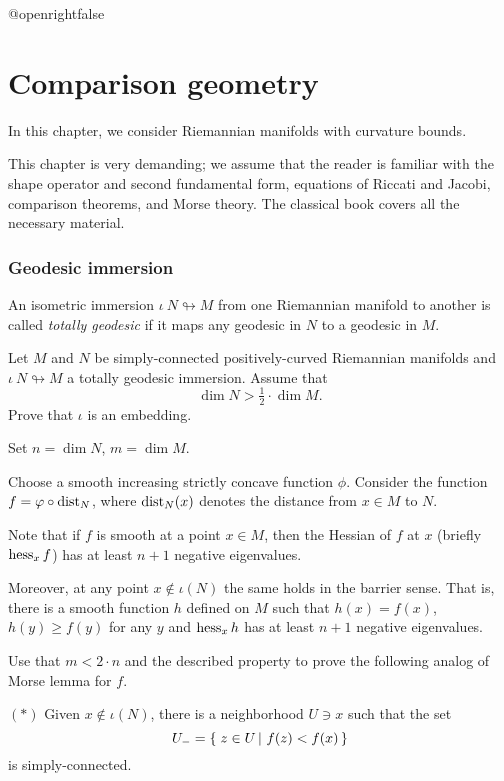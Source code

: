 \csname @openrightfalse\endcsname
\chapter{Comparison geometry}

In this chapter, we consider Riemannian manifolds with curvature bounds.

This chapter is very demanding;
we assume that the reader is familiar with   
the shape operator and second fundamental form, 
equations of Riccati and Jacobi,
comparison theorems,
and Morse theory.
The classical book \cite{cheeger-ebin} covers all the  necessary  material.

\subsection*{Geodesic immersion\hard}
\label{Geodesic immersion}

An isometric immersion $\iota\:N\looparrowright M$ from one Riemannian manifold to another is called \emph{totally geodesic} if it maps any geodesic in $N$ to a geodesic in $M$.

\begin{pr}
Let $M$ and $N$ be simply-connected positively-curved Riemannian manifolds and $\iota\:N\looparrowright M$ a totally geodesic immersion.
Assume that 
\[\dim N>\tfrac 12\cdot \dim M.\]
Prove that $\iota$ is an embedding.
\end{pr}

Set $n=\dim N$, $m=\dim M$.

Choose a smooth increasing strictly concave function $\phi$.
Consider the function $f=\varphi\circ\operatorname{\rm dist}\nolimits_N$,
where $\operatorname{\rm dist}\nolimits_N(x)$ denotes the distance from $x\in M$ to $N$.

Note that if $f$ is smooth at a point $x\in M$, then the Hessian of $f$ at $x$ (briefly $\operatorname{\rm hess}\nolimits_xf$) has at least $n+1$ negative eigenvalues.

Moreover, at any point $x\notin \iota(N)$ the same holds in the barrier sense\label{page:barrier sense}.
That is, there is a smooth function $h$ defined on $M$
such that $h(x)=f(x)$, $h(y)\ge f(y)$ for any $y$
and $\operatorname{\rm hess}\nolimits_xh$ has at least $n+1$ negative eigenvalues.

Use that $m< 2\cdot n$ and the described property to prove the following
analog of Morse lemma for $f$.

\begin{cl}{$({*})$}
 Given $x\notin \iota(N)$, there is a neighborhood $U\ni x$ such that the set 
\[U_-=\set{z\in U}{f(z)<f(x)}\] is simply-connected.
\end{cl}

